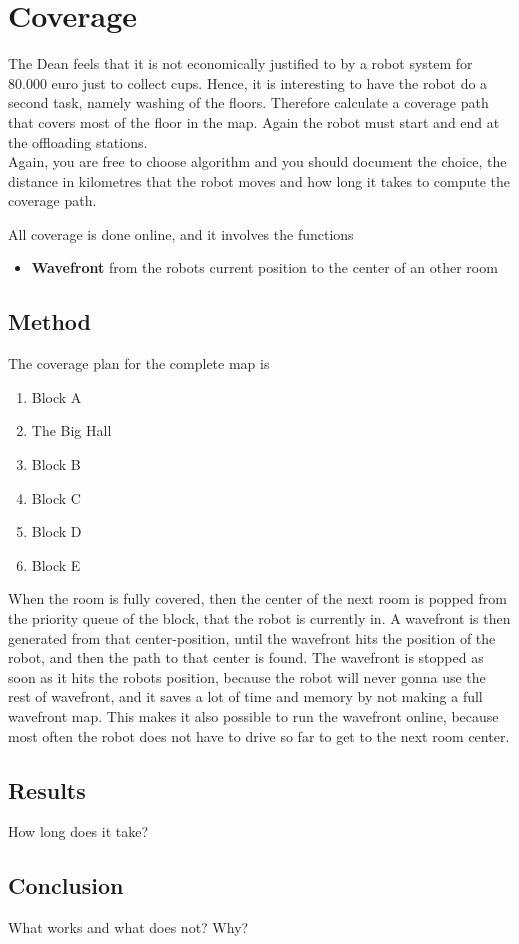\section{Coverage}
\label{sec::coverage}
The Dean feels that it is not economically justified to by a robot system for 80.000 euro just to collect cups. Hence, it is interesting to have the robot do a second task, namely washing of the floors. Therefore calculate a coverage path that covers most of the floor in the map. Again the robot must start and end at the offloading stations.\\[0.2cm]
Again, you are free to choose algorithm and you should document the choice, the distance in kilometres that the robot moves and how long it takes to compute the coverage path.

All coverage is done online, and it involves the functions
\begin{itemize}\itemsep-2pt
\item \textbf{Wavefront} from the robots current position to the center of an other room
\end{itemize}

\subsection{Method}
The coverage plan for the complete map is
\begin{enumerate}\itemsep-2pt
\item Block A
\item The Big Hall
\item Block B
\item Block C
\item Block D
\item Block E
\end{enumerate}

When the room is fully covered, then the center of the next room is popped from the priority queue of the block, that the robot is currently in. A wavefront is then generated from that center-position, until the wavefront hits the position of the robot, and then the path to that center is found. The wavefront is stopped as soon as it hits the robots position, because the robot will never gonna use the rest of wavefront, and it saves a lot of time and memory by not making a full wavefront map. This makes it also possible to run the wavefront online, because most often the robot does not have to drive so far to get to the next room center. 

\subsection{Results}
How long does it take?

\subsection{Conclusion}
What works and what does not? Why?
